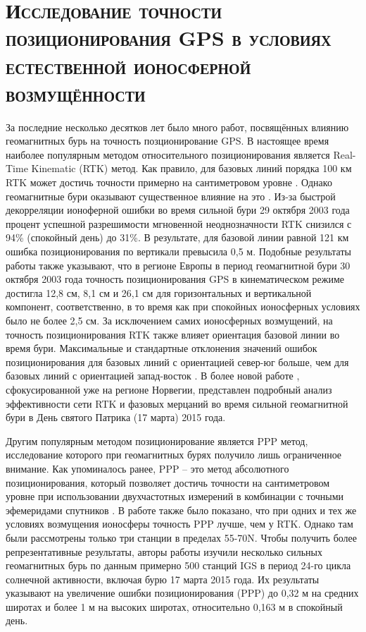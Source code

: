 \chapter{\textsc{Исследование точности позиционирования GPS в условиях естественной ионосферной возмущённости}}
\label{chap-3}

За последние несколько десятков лет было много работ, посвящённых влиянию геомагнитных бурь на точность позционирование GPS.
В настоящее время наиболее популярным методом относительного позиционирования является Real-Time Kinematic (RTK) метод.
Как правило, для базовых линий порядка 100 км RTK может достичь точности примерно на сантиметровом уровне \cite{Rizos2002}.
Однако геомагнитные бури оказывают существенное влияние на это \cite{Jacobsen2012}. 
Из-за быстрой декорреляции ионоферной ошибки во время сильной бури 29 октября 2003 года процент успешной разрешимости мгновенной неоднозначности RTK снизился с 94\% (спокойный день) до 31\%.  
В результате, для базовой линии равной 121 км ошибка позиционирования по вертикали превысила 0,5 м.
Подобные результаты работы \cite{Bergeot2011} также указывают, что в регионе Европы в период геомагнитной бури 30 октября 2003 года точность позиционирования GPS в кинематическом режиме достигла 12,8 см, 8,1 см и 26,1 см для горизонтальных и вертикальной компонент, соответственно, в то время как при спокойных ионосферных условиях было не более 2,5 см.
За исключением самих ионосферных возмущений, на точность позиционирования RTK также влияет ориентация базовой линии во время бури.
Максимальные и стандартные отклонения значений ошибок позиционирования для базовых линий с ориентацией север-юг больше, чем для базовых линий с ориентацией запад-восток \cite{Lejeune2012}. 
В более новой работе \cite{Jacobsen2016}, сфокусированной уже на регионе Норвегии, представлен подробный анализ эффективности сети RTK и фазовых мерцаний во время сильной геомагнитной бури в День святого Патрика (17 марта) 2015 года.   

Другим популярным методом позиционирование является PPP метод, исследование которого при геомагнитных бурях получило лишь ограниченное внимание. 
Как упоминалось ранее, PPP --  это метод абсолютного позиционирования, который позволяет достичь точности на сантиметровом уровне при использовании двухчастотных измерений в комбинации с точными эфемеридами спутников \cite{Zumberge1997,Lou2016}. 
В работе \cite{Jacobsen2016} также было показано, что при одних и тех же условиях возмущения ионосферы точность PPP лучше, чем у RTK.
Однако там были рассмотрены только три станции в пределах 55-70\degree N.
Чтобы получить более репрезентативные результаты, авторы работы \cite{Luo2018} изучили несколько сильных геомагнитных бурь по данным примерно 500 станций IGS в период 24-го цикла солнечной активности, включая бурю 17 марта 2015 года.     
Их результаты указывают на увеличение ошибки позиционирования (PPP) до 0,32 м на средних широтах и более 1 м на высоких широтах, относительно 0,163 м в спокойный день.


